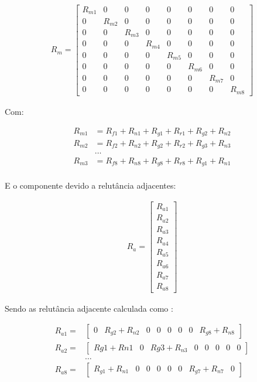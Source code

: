  \begin{align}
  R_m  = 
	\begin{bmatrix}
			 R_{m1} & 0 & 0 & 0 & 0 & 0 & 0 & 0 \\
			 0 & R_{m2} & 0 & 0 & 0 & 0 & 0 & 0 \\
			 0 & 0 & R_{m3} & 0 & 0 & 0 & 0 & 0 \\
			 0 & 0 & 0 & R_{m4} & 0 & 0 & 0 & 0 \\
			 0 & 0 & 0 & 0 & R_{m5} & 0 & 0 & 0 \\
			 0 & 0 & 0 & 0 & 0 & R_{m6} & 0 & 0 \\
			 0 & 0 & 0 & 0 & 0 & 0 & R_{m7} & 0  \\
 			 0 & 0 & 0 & 0 & 0 & 0 & 0 & R_{m8} 
	\end{bmatrix}
 \end{align}
 
Com:
 
 \begin{align}
	 R_{m1} &= R_{f1} + R_{n1} + R_{g1} + R_{r1} + R_{g2} + R_{n2} \\
	 R_{m2} &= R_{f2} + R_{n2} + R_{g2} + R_{r2} + R_{g3} + R_{n3}  \\
	 & \ldots \\
 	 R_{m3} &= R_{f8} + R_{n8} + R_{g8} + R_{r8} + R_{g1} + R_{n1}  \\
 \end{align}

E o componente devido a relutância adjacentes:

\begin{align}
R_a =
	\begin{bmatrix}
		R_{a1} \\ 	R_{a2} \\ 	R_{a3} \\ 	R_{a4} \\ 
		R_{a5} \\ 	R_{a6} \\ 	R_{a7} \\ 	R_{a8} 
	\end{bmatrix}
\end{align}

Sendo as relutância adjacente calculada como :

 \begin{align}
	 R_{a1} =& 
	 \begin{bmatrix}
			0 & R_{g2} + R_{n2} & 0 & 0 & 0 & 0 & 0 & R_{g8}+R_{n8}
	 \end{bmatrix} \\
	 R_{a2} =&
	 \begin{bmatrix}
		R{g1}+R{n1} & 0 & R{g3}+R_{n3} & 0 & 0 & 0 & 0 & 0
	 \end{bmatrix} \\
	 & \ldots \\
	 R_{a8} =&
	 \begin{bmatrix}
		R_{g1}+R_{n1} & 0 & 0 & 0 & 0  &0 & R_{g7}+R_{n7} & 0 
	 \end{bmatrix} 
 \end{align}


